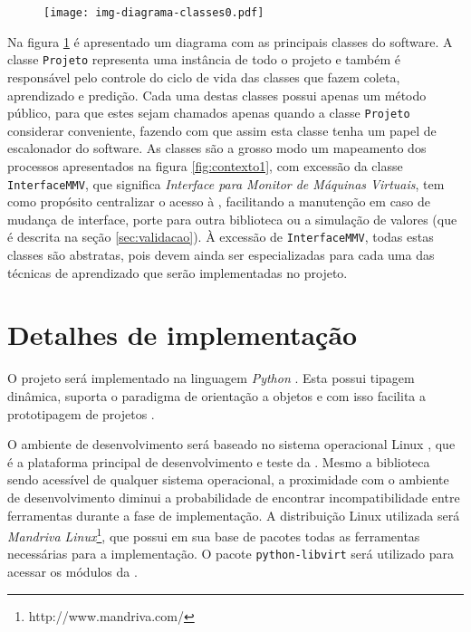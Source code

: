
\begin{figure}[htp]
\centering
\texttt{[image: img-diagrama-classes0.pdf]}
\label{fig:diagramaclasses0}
\end{figure}

Na figura \ref{fig:diagramaclasses0} é apresentado um diagrama com as
principais classes do software. A classe \texttt{Projeto} representa uma
instância de todo o projeto e também é responsável pelo controle do ciclo
de vida das classes que fazem coleta, aprendizado e predição. Cada uma
destas classes possui apenas um método público, para que estes sejam
chamados apenas quando a classe \texttt{Projeto} considerar conveniente,
fazendo com que assim esta classe tenha um papel de escalonador do
software. As classes são a grosso modo um mapeamento dos processos
apresentados na figura \ref{fig:contexto1}, com excessão da classe
\texttt{InterfaceMMV}, que significa \emph{Interface para Monitor de
Máquinas Virtuais}, tem como propósito centralizar o acesso à \libvirt{},
facilitando a manutenção em caso de mudança de interface, porte para outra
biblioteca ou a simulação de valores (que é descrita na seção
\ref{sec:validacao}). À excessão de \texttt{InterfaceMMV}, todas estas
classes são abstratas, pois devem ainda ser especializadas para cada uma
das técnicas de aprendizado que serão implementadas no projeto.


\section{Detalhes de implementação}

O projeto será implementado na linguagem \emph{Python} \cite{rossum1995python}.
Esta possui tipagem dinâmica, suporta o paradigma de orientação a objetos e com
isso facilita a prototipagem de projetos \cite{lutz2006programming}.

O ambiente de desenvolvimento será baseado no sistema operacional Linux
\cite{morimoto2004entendendo}, que é a plataforma principal de
desenvolvimento e teste da \libvirt{}. Mesmo a biblioteca sendo acessível
de qualquer sistema operacional, a proximidade com o ambiente de
desenvolvimento diminui a probabilidade de encontrar incompatibilidade
entre ferramentas durante a fase de implementação. A distribuição Linux
utilizada será \emph{Mandriva Linux}\footnote{http://www.mandriva.com/},
que possui em sua base de pacotes todas as ferramentas necessárias para a
implementação. O pacote \texttt{python-libvirt} será utilizado para acessar
os módulos da \libvirt{}.

